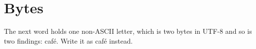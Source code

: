 \section{Bytes}
\label{sec:ch01-bytes}

The next word holds one non-ASCII letter, which is two bytes in UTF-8 and so is
two findings: café. Write it as caf\'{e} instead.
